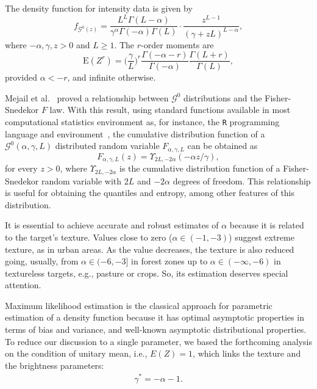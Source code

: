 \documentclass[twocolumn]{svjour3}
\begin{document}
	The density function for intensity data is given by
	\begin{equation}
		f_{\mathcal{G}^{0}(z)} =\frac{L^{L}\Gamma ( L-\alpha
			) }{\gamma ^{\alpha }\Gamma ( -\alpha ) \Gamma (
			L) }\cdot  
		\frac{z^{L-1}}{( \gamma +zL) ^{L-\alpha }},%
		\label{ec_dens_gI0}
	\end{equation}
	where $-\alpha,\gamma ,z>0$ and $L\geq 1$. 
	The $r$-order moments are
	\begin{equation}
		\text{E}(Z^r) =\Big(\frac{\gamma}{L}\Big)^r\frac{\Gamma ( -\alpha-r )}{ \Gamma (-\alpha) }
		\frac{\Gamma (L+r )}{\Gamma (L)},
		\label{moments_gI0}
	\end{equation}
	provided $\alpha<-r$, and infinite otherwise.
	
	Mejail et al.~\cite{MejailJacoboFreryBustos:IJRS} proved a relationship between $\mathcal G^0$ distributions and the Fisher-Snedekor $F$ law.
	With this result, using standard functions available in most computational statistics environment as, for instance, the \texttt R programming language and environment~\cite{RLanguage}, the cumulative distribution function of a $\mathcal G^0(\alpha,\gamma,L)$ distributed random variable $F_{\alpha,\gamma,L}$ can be obtained as
	\begin{equation}
		F_{\alpha,\gamma,L}(z) = \Upsilon_{2L, -2\alpha}(-\alpha  z / \gamma),
		\label{eq:CDFG0}
	\end{equation}
	for every $z>0$, where $\Upsilon_{2L, -2\alpha}$ is the cumulative distribution function of a Fisher-Snedekor random variable with $2L$ and $-2\alpha$ degrees of freedom.
	This relationship is useful for obtaining the quantiles and entropy, among other features of this distribution.
	
	It is essential to achieve accurate and robust estimates of $\alpha$ because it is related to the target's texture. 
	Values close to zero ($\alpha \in (-1,-3)$) suggest extreme texture, as in urban areas. 
	As the value decreases, the texture is also reduced going, usually, from $\alpha \in (-6,-3]$ in forest zones up to $\alpha\in(-\infty,-6)$ in textureless targets, e.g., pasture or crops. So, its estimation deserves special attention.
	
	Maximum likelihood estimation is the classical approach for parametric estimation of a density function because it has optimal asymptotic properties in terms of bias and variance, and well-known asymptotic distributional properties.
	To reduce our discussion to a single parameter, we based the forthcoming analysis on the condition of unitary mean, i.e., $E(Z)=1$, which links the texture and the brightness parameters:
	\begin{align}
		\label{RelationAlphaGamma}
		\gamma^* =-\alpha-1.
	\end{align}
	
\end{document}
